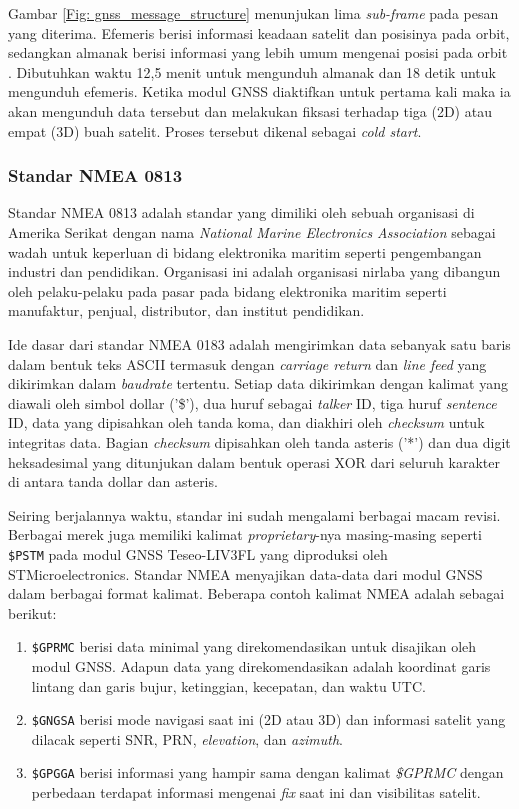 Gambar \ref{Fig: gnss_message_structure} menunjukan lima \textit{sub-frame} pada pesan yang diterima. Efemeris berisi informasi keadaan satelit dan posisinya pada orbit, sedangkan almanak berisi informasi yang lebih umum mengenai posisi pada orbit \cite{Lenhart2022}. Dibutuhkan waktu 12,5 menit untuk mengunduh almanak dan 18 detik untuk mengunduh efemeris. Ketika modul GNSS diaktifkan untuk pertama kali maka ia akan mengunduh data tersebut dan melakukan fiksasi terhadap tiga (2D) atau empat (3D) buah satelit. Proses tersebut dikenal sebagai \textit{cold start}. 

\subsubsection{Standar NMEA 0813}
Standar NMEA 0813 adalah standar yang dimiliki oleh sebuah organisasi di Amerika Serikat dengan nama \textit{National Marine Electronics Association} sebagai wadah untuk keperluan di bidang elektronika maritim seperti pengembangan industri dan pendidikan. Organisasi ini adalah organisasi nirlaba yang dibangun oleh pelaku-pelaku pada pasar pada bidang elektronika maritim seperti manufaktur, penjual, distributor, dan institut pendidikan.

Ide dasar dari standar NMEA 0183 adalah mengirimkan data sebanyak satu baris dalam bentuk teks ASCII termasuk dengan \textit{carriage return} dan \textit{line feed} yang dikirimkan dalam \textit{baudrate} tertentu. Setiap data dikirimkan dengan kalimat yang diawali oleh simbol dollar ('\$'), dua huruf sebagai \textit{talker} ID, tiga huruf \textit{sentence} ID, data yang dipisahkan oleh tanda koma, dan diakhiri oleh \textit{checksum} untuk integritas data. Bagian \textit{checksum} dipisahkan oleh tanda asteris ('*') dan dua digit heksadesimal yang ditunjukan dalam bentuk operasi XOR dari seluruh karakter di antara tanda dollar dan asteris.

Seiring berjalannya waktu, standar ini sudah mengalami berbagai macam revisi. Berbagai merek juga memiliki kalimat \textit{proprietary}-nya masing-masing seperti \texttt{\$PSTM} pada modul GNSS Teseo-LIV3FL yang diproduksi oleh STMicroelectronics. Standar NMEA menyajikan data-data dari modul GNSS dalam berbagai format kalimat. Beberapa contoh kalimat NMEA adalah sebagai berikut:
\begin{enumerate}
	\item \texttt{\$GPRMC} berisi data minimal yang direkomendasikan untuk disajikan oleh modul GNSS. Adapun data yang direkomendasikan adalah koordinat garis lintang dan garis bujur, ketinggian, kecepatan, dan waktu UTC.
	\item \texttt{\$GNGSA} berisi mode navigasi saat ini (2D atau 3D) dan informasi satelit yang dilacak seperti SNR, PRN, \textit{elevation}, dan \textit{azimuth}.
	\item \texttt{\$GPGGA} berisi informasi yang hampir sama dengan kalimat \textit{\$GPRMC} dengan perbedaan terdapat informasi mengenai \textit{fix} saat ini dan visibilitas satelit.
\end{enumerate}

